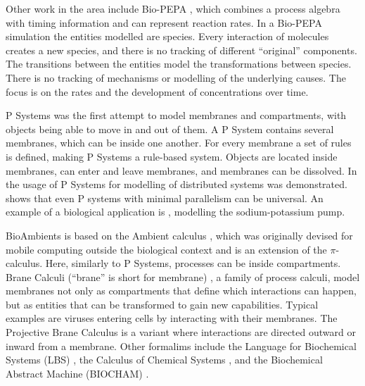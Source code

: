 Other work in the area include Bio-PEPA \cite{CiocchettaBiopepa}, which combines a process algebra with timing information and can represent reaction rates. In a Bio-PEPA simulation the entities modelled are species. Every interaction of molecules creates a new species, and there is no tracking of different ``original'' components. The transitions between the entities model the transformations between species. There is no tracking of mechanisms or modelling of the underlying causes. The focus is on the rates and the development of concentrations over time.  

P Systems \cite{psystems} was the first attempt to model membranes and compartments, with objects being able to move in and out of them. A P System contains several membranes, which can be inside one another. For every membrane a set of rules is defined, making P Systems a rule-based system. Objects are located inside membranes, can enter and leave membranes, and membranes can be dissolved. In \cite{CIOBANU2003123} the usage of P Systems for modelling of distributed systems was demonstrated. \cite{CIOBANU2007117} shows that even P systems with minimal parallelism can be universal. An example of a biological application is \cite{10.1007/978-3-540-31837-8_12}, modelling the sodium-potassium pump. 

BioAmbients \cite{RegevBioambients} is based on the Ambient calculus \cite{CARDELLI2000177}, which was originally devised for mobile computing outside the biological context and is an extension of the $\pi$-calculus. Here, similarly to P Systems, processes can be inside compartments. %
Brane Calculi (``brane'' is short for membrane) \cite{CardelliBraneCalculi}, a family of process calculi, model membranes not only as compartments that define which interactions can happen, but as entities that can be transformed to gain new capabilities. Typical examples are viruses entering cells by interacting with their membranes. The Projective Brane Calculus \cite{ProjectiveBrane} is a variant where interactions are directed outward or inward from a membrane. Other formalims include the Language for Biochemical Systems (LBS) \cite{PlotkinLBS}, the Calculus of Chemical Systems \cite{PlotkinCCS}, and the Biochemical Abstract Machine (BIOCHAM) \cite{biocham}. 

